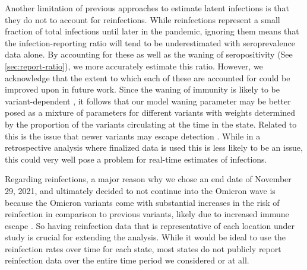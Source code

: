Another limitation of previous approaches to estimate latent infections is that
they do not to account for reinfections. While reinfections represent a small
fraction of total infections until later in the pandemic, ignoring them means
that the infection-reporting ratio will tend to be underestimated with
seroprevalence data alone. By accounting for these as well as the waning of
seropositivity (See \autoref{sec:report-ratio}), we more accurately estimate
this ratio.
However, we acknowledge that the extent to which each of these are accounted for
could be improved upon in future work. Since the waning of immunity is likely to
be variant-dependent \citep{pooley2023durability}, it follows that our model
waning parameter may be better posed as a mixture of parameters for different
variants with weights determined by the proportion of the variants circulating
at the time in the state. Related to this is the issue that newer variants may
escape detection \citep{nih2022assessing, fda2023sars}. While in a retrospective
analysis where finalized data is used this is less likely to be an issue, this
could very well pose a problem for real-time estimates of infections.

Regarding reinfections, a major reason why we chose an end date of November 29,
2021, and ultimately decided to not continue into the Omicron wave is because
the Omicron variants come with substantial increases in the risk of reinfection
in comparison to previous variants, likely due to increased immune escape
\citep{wei2024risk, pulliam2022increased, eythorsson2022rate}. So having
reinfection data that is representative of each location under study is crucial
for extending the analysis. While it would be ideal to use the reinfection rates
over time for each \US state, most states do not publicly report reinfection
data over the entire time period we considered or at all.



